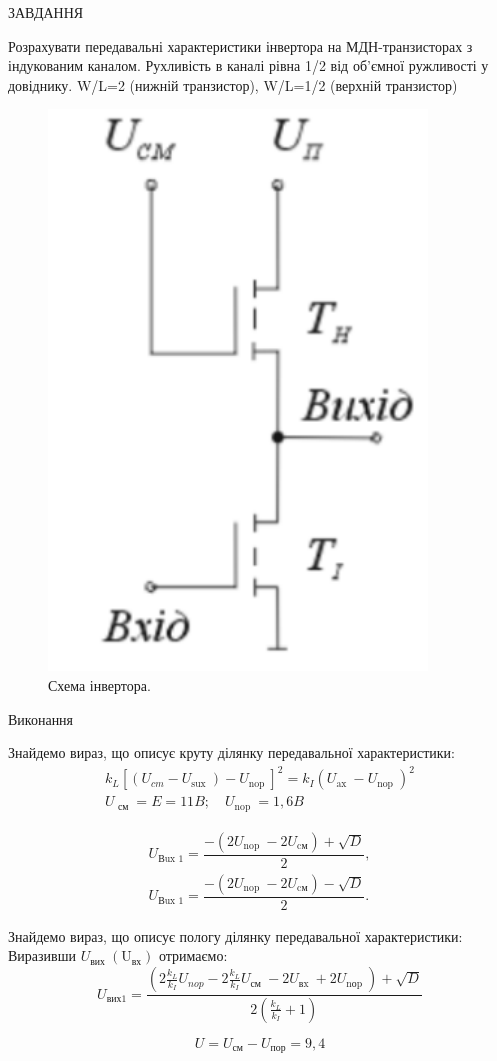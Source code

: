 \documentclass[a4paper,14pt]{extreport}
\begin{document}
\begin{center}ЗАВДАННЯ\end{center}

Розрахувати передавальні характеристики інвертора на МДН-транзисторах з 
індукованим каналом. Рухливість в каналі рівна 1/2 від об'ємної ружливості у довіднику. 
W/L=2 (нижній транзистор), W/L=1/2 (верхній транзистор)



\begin{figure}[h]
  \begin{center}
    \includegraphics[width= 0.25\linewidth]{1.png}
  \end{center}
  \caption{Схема інвертора.}
\end{figure}

\begin{center}Виконання\end{center}

Знайдемо вираз, що описує круту ділянку передавальної характеристики:
$$
\begin{array}{c}
k_{L}\left[\left(U_{cm}-U_{\text {sux }}\right)-U_{\text {nop }}\right]^{2}=k_{I}\left(U_{\text {ax }}-U_{\text {nop }}\right)^{2} \\
U_{\text { см }}=E=11 B; \quad U_{\text {nop }}=1,6 B
\end{array}
$$


$$
\begin{array}{c}
U_{\text {Вux } 1}=\dfrac{-\left(2 U_{\text {nop }}-2 U_{\text {cм}}\right)+\sqrt{D}}{2}, \\
U_{\text {Вux } 1}=\dfrac{-\left(2 U_{\text {nop }}-2 U_{\text {cм}}\right)-\sqrt{D}}{2} .
\end{array}
$$

Знайдемо вираз, що описує пологу ділянку передавальної характеристики:
Виразивши $U_{\text {вих }}\left(\mathrm{U}_{\text{вх}}\right)$ отримаємо:
$$
U_{\text {вих1}}=\frac{\left(2 \frac{k_{L}}{k_{I}} U_{nop}-2 \frac{k_{L}}{k_{I}} U_{\text {см }}-2 U_{\text {вx }}+2 U_{\text {nоp }}\right)+\sqrt{D}}{2\left(\frac{k_{L}}{k_{I}}+1\right)}
$$


$$ U = U_{\text{см}} - U_{\text{пор}} = 9,4 $$
\end{document}
